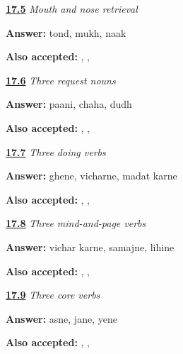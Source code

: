 \noindent\begin{minipage}[t]{\linewidth}
\raggedright
\hyperlink{review-MR-R14-mouth-nose-check}{\textbf{17.5}} \emph{Mouth and nose retrieval}\par
\small \textbf{Answer:} tond, mukh, naak\par
\footnotesize \textbf{Also accepted:} , , 
\end{minipage}\par\medskip

\noindent\begin{minipage}[t]{\linewidth}
\raggedright
\hyperlink{review-MR-R14-food-check}{\textbf{17.6}} \emph{Three request nouns}\par
\small \textbf{Answer:} paani, chaha, dudh\par
\footnotesize \textbf{Also accepted:} , , 
\end{minipage}\par\medskip

\noindent\begin{minipage}[t]{\linewidth}
\raggedright
\hyperlink{review-MR-R14-doing-check}{\textbf{17.7}} \emph{Three doing verbs}\par
\small \textbf{Answer:} ghene, vicharne, madat karne\par
\footnotesize \textbf{Also accepted:} , ,  
\end{minipage}\par\medskip

\noindent\begin{minipage}[t]{\linewidth}
\raggedright
\hyperlink{review-MR-R14-mind-check}{\textbf{17.8}} \emph{Three mind-and-page verbs}\par
\small \textbf{Answer:} vichar karne, samajne, lihine\par
\footnotesize \textbf{Also accepted:}  , , 
\end{minipage}\par\medskip

\noindent\begin{minipage}[t]{\linewidth}
\raggedright
\hyperlink{review-MR-R14-core-check}{\textbf{17.9}} \emph{Three core verbs}\par
\small \textbf{Answer:} asne, jane, yene\par
\footnotesize \textbf{Also accepted:} , , 
\end{minipage}\par\medskip

